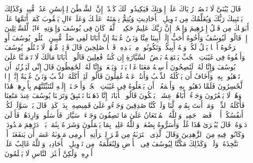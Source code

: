 \startbuffer[\q:12:5]
قَالَ یَٰبُنَیَّ لَا تَقۡصُصۡ رُءۡیَاكَ عَلَىٰۤ إِخۡوَتِكَ فَیَكِیدُوا۟ لَكَ كَیۡدًاۖ إِنَّ ٱلشَّیۡطَٰنَ لِلۡإِنسَٰنِ عَدُوࣱّ مُّبِینࣱ%
\stopbuffer%
\startbuffer[\q:12:6]
وَكَذَٰلِكَ یَجۡتَبِیكَ رَبُّكَ وَیُعَلِّمُكَ مِن تَأۡوِیلِ ٱلۡأَحَادِیثِ وَیُتِمُّ نِعۡمَتَهُۥ عَلَیۡكَ وَعَلَىٰۤ ءَالِ یَعۡقُوبَ كَمَاۤ أَتَمَّهَا عَلَىٰۤ أَبَوَیۡكَ مِن قَبۡلُ إِبۡرَٰهِیمَ وَإِسۡحَٰقَۚ إِنَّ رَبَّكَ عَلِیمٌ حَكِیمࣱ%
\stopbuffer%
\startbuffer[\q:12:7]
۞ لَّقَدۡ كَانَ فِی یُوسُفَ وَإِخۡوَتِهِۦۤ ءَایَٰتࣱ لِّلسَّاۤئِلِینَ%
\stopbuffer%
\startbuffer[\q:12:8]
إِذۡ قَالُوا۟ لَیُوسُفُ وَأَخُوهُ أَحَبُّ إِلَىٰۤ أَبِینَا مِنَّا وَنَحۡنُ عُصۡبَةٌ إِنَّ أَبَانَا لَفِی ضَلَٰلࣲ مُّبِینٍ%
\stopbuffer%
\startbuffer[\q:12:9]
ٱقۡتُلُوا۟ یُوسُفَ أَوِ ٱطۡرَحُوهُ أَرۡضࣰا یَخۡلُ لَكُمۡ وَجۡهُ أَبِیكُمۡ وَتَكُونُوا۟ مِنۢ بَعۡدِهِۦ قَوۡمࣰا صَٰلِحِینَ%
\stopbuffer%
\startbuffer[\q:12:10]
قَالَ قَاۤئِلࣱ مِّنۡهُمۡ لَا تَقۡتُلُوا۟ یُوسُفَ وَأَلۡقُوهُ فِی غَیَٰبَتِ ٱلۡجُبِّ یَلۡتَقِطۡهُ بَعۡضُ ٱلسَّیَّارَةِ إِن كُنتُمۡ فَٰعِلِینَ%
\stopbuffer%
\startbuffer[\q:12:11]
قَالُوا۟ یَٰۤأَبَانَا مَالَكَ لَا تَأۡمَـ۫نَّا عَلَىٰ یُوسُفَ وَإِنَّا لَهُۥ لَنَٰصِحُونَ%
\stopbuffer%
\startbuffer[\q:12:12]
أَرۡسِلۡهُ مَعَنَا غَدࣰا یَرۡتَعۡ وَیَلۡعَبۡ وَإِنَّا لَهُۥ لَحَٰفِظُونَ%
\stopbuffer%
\startbuffer[\q:12:13]
قَالَ إِنِّی لَیَحۡزُنُنِیۤ أَن تَذۡهَبُوا۟ بِهِۦ وَأَخَافُ أَن یَأۡكُلَهُ ٱلذِّئۡبُ وَأَنتُمۡ عَنۡهُ غَٰفِلُونَ%
\stopbuffer%
\startbuffer[\q:12:14]
قَالُوا۟ لَئِنۡ أَكَلَهُ ٱلذِّئۡبُ وَنَحۡنُ عُصۡبَةٌ إِنَّاۤ إِذࣰا لَّخَٰسِرُونَ%
\stopbuffer%
\startbuffer[\q:12:15]
فَلَمَّا ذَهَبُوا۟ بِهِۦ وَأَجۡمَعُوۤا۟ أَن یَجۡعَلُوهُ فِی غَیَٰبَتِ ٱلۡجُبِّۚ وَأَوۡحَیۡنَاۤ إِلَیۡهِ لَتُنَبِّئَنَّهُم بِأَمۡرِهِمۡ هَٰذَا وَهُمۡ لَا یَشۡعُرُونَ%
\stopbuffer%
\startbuffer[\q:12:16]
وَجَاۤءُوۤ أَبَاهُمۡ عِشَاۤءࣰ یَبۡكُونَ%
\stopbuffer%
\startbuffer[\q:12:17]
قَالُوا۟ یَٰۤأَبَانَاۤ إِنَّا ذَهَبۡنَا نَسۡتَبِقُ وَتَرَكۡنَا یُوسُفَ عِندَ مَتَٰعِنَا فَأَكَلَهُ ٱلذِّئۡبُۖ وَمَاۤ أَنتَ بِمُؤۡمِنࣲ لَّنَا وَلَوۡ كُنَّا صَٰدِقِینَ%
\stopbuffer%
\startbuffer[\q:12:18]
وَجَاۤءُو عَلَىٰ قَمِیصِهِۦ بِدَمࣲ كَذِبࣲۚ قَالَ بَلۡ سَوَّلَتۡ لَكُمۡ أَنفُسُكُمۡ أَمۡرࣰاۖ فَصَبۡرࣱ جَمِیلࣱۖ وَٱللَّهُ ٱلۡمُسۡتَعَانُ عَلَىٰ مَا تَصِفُونَ%
\stopbuffer%
\startbuffer[\q:12:19]
وَجَاۤءَتۡ سَیَّارَةࣱ فَأَرۡسَلُوا۟ وَارِدَهُمۡ فَأَدۡلَىٰ دَلۡوَهُۥۖ قَالَ یَٰبُشۡرَىٰ هَٰذَا غُلَٰمࣱۚ وَأَسَرُّوهُ بِضَٰعَةࣰۚ وَٱللَّهُ عَلِیمُۢ بِمَا یَعۡمَلُونَ%
\stopbuffer%
\startbuffer[\q:12:20]
وَشَرَوۡهُ بِثَمَنِۭ بَخۡسࣲ دَرَٰهِمَ مَعۡدُودَةࣲ وَكَانُوا۟ فِیهِ مِنَ ٱلزَّٰهِدِینَ%
\stopbuffer%
\startbuffer[\q:12:21]
وَقَالَ ٱلَّذِی ٱشۡتَرَىٰهُ مِن مِّصۡرَ لِٱمۡرَأَتِهِۦۤ أَكۡرِمِی مَثۡوَىٰهُ عَسَىٰۤ أَن یَنفَعَنَاۤ أَوۡ نَتَّخِذَهُۥ وَلَدࣰاۚ وَكَذَٰلِكَ مَكَّنَّا لِیُوسُفَ فِی ٱلۡأَرۡضِ وَلِنُعَلِّمَهُۥ مِن تَأۡوِیلِ ٱلۡأَحَادِیثِۚ وَٱللَّهُ غَالِبٌ عَلَىٰۤ أَمۡرِهِۦ وَلَٰكِنَّ أَكۡثَرَ ٱلنَّاسِ لَا یَعۡلَمُونَ%
